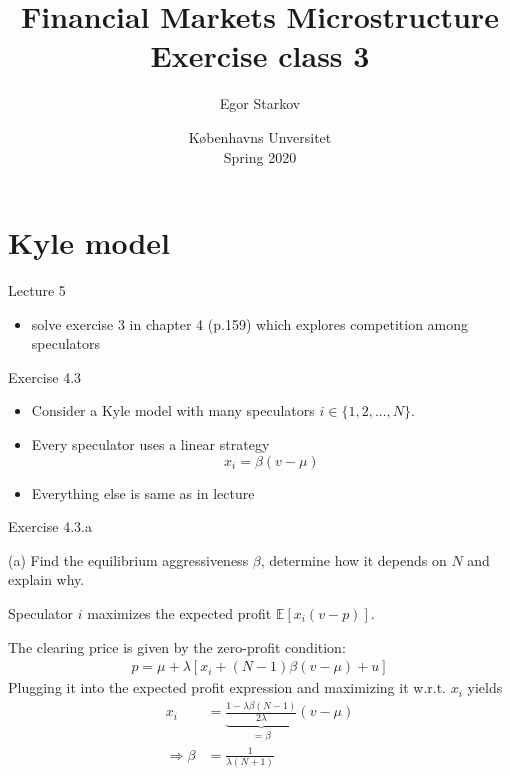 \documentclass[english,10pt
,aspectratio=169
]{beamer}
\title{Financial Markets Microstructure \\ Exercise class 3}
\author{Egor Starkov}
\date{K{\o}benhavns Unversitet \\
	Spring 2020}
\begin{document}
\frame[plain]{\titlepage}
\addtocounter{framenumber}{-1}



\section{Kyle model}

\begin{frame}{Lecture 5}
	\begin{itemize}
		\item solve exercise 3 in chapter 4 (p.159) which explores competition among speculators
	\end{itemize}
\end{frame}


\begin{frame}{Exercise 4.3}
	\begin{itemize}
		\item Consider a Kyle model with many speculators $i \in \{1,2,...,N\}$.
		\item Every speculator uses a linear strategy
		$$ x_i = \beta (v-\mu) $$
		\item Everything else is same as in lecture
	\end{itemize}
\end{frame}


\begin{frame}{Exercise 4.3.a}
	\begin{exampleblock}{}
		(a) Find the equilibrium aggressiveness $\beta$, determine how it depends on $N$ and explain why.
	\end{exampleblock}
	
	\pause
	
	Speculator $i$ maximizes the expected profit $\mathbb{E} [x_i (v-p)]$.
	
	The clearing price is given by the zero-profit condition:
	\begin{align*}
		p = \mu + \lambda [x_i + (N-1) \beta (v-\mu) + u]
	\end{align*}
	Plugging it into the expected profit expression and maximizing it w.r.t. $x_i$ yields
	\begin{align*}
		x_i &= \underbrace{\frac{1 - \lambda \beta (N-1)}{2 \lambda}}_{=\beta} (v-\mu)
		\\
		\Rightarrow
		\beta &= \frac{1}{\lambda (N+1)}
	\end{align*}
\end{frame}
\end{document}
